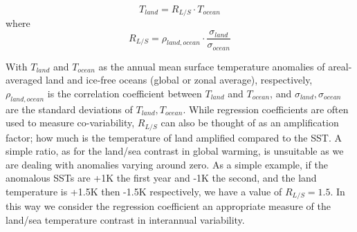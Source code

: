 \begin{equation}
T_{land} = R_{L/S} \cdot T_{ocean}
\end{equation}
where
\begin{equation}
	R_{L/S} = \rho_{land,ocean}\cdot \frac{\sigma_{land}}{\sigma_{ocean}}
\end{equation}

With $T_{land}$ and $T_{ocean}$ as the annual mean surface temperature anomalies 
of areal-averaged land and ice-free oceans (global or zonal average), 
respectively, $\rho_{land,ocean}$ is the correlation coefficient between 
$T_{land}$ and $T_{ocean}$, and $\sigma_{land}, \sigma_{ocean}$ are the standard 
deviations of $T_{land}, T_{ocean}$. While regression coefficients are often 
used to measure co-variability, $R_{L/S}$ can also be thought of as an 
amplification factor; how much is the temperature of land amplified compared to 
the SST. A simple ratio, as for the land/sea contrast in global warming, is 
unsuitable as we are dealing with anomalies varying around zero. As a simple 
example, if the anomalous SSTs are +1K the first year and -1K the second, and 
the land temperature is +1.5K then -1.5K respectively, we have a value of 
$R_{L/S} = 1.5$. In this way we consider the regression coefficient an 
appropriate measure of the land/sea temperature contrast in interannual 
variability.

